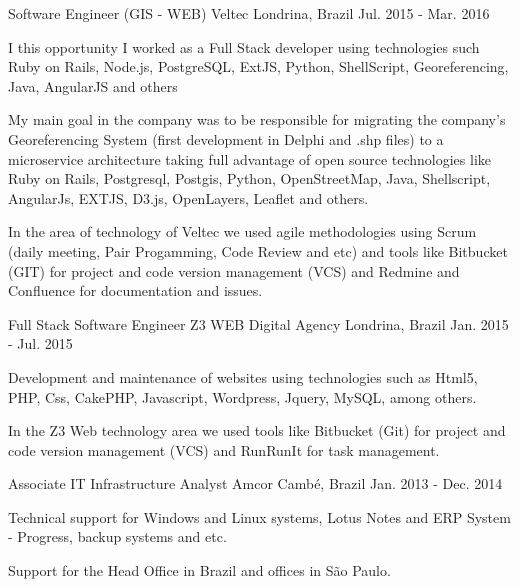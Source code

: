 \begin{cventries}
  \cventry
    {Software Engineer (GIS - WEB)} %
    {Veltec} %
    {Londrina, Brazil} %
    {Jul. 2015 - Mar. 2016} %
    {
      \begin{cvitems} %
        \item { I this opportunity I worked as a Full Stack developer using technologies such Ruby on Rails, Node.js, PostgreSQL, ExtJS, Python, ShellScript, Georeferencing, Java, AngularJS and others}
\item {My main goal in the company was to be responsible for migrating the company's Georeferencing System (first development in Delphi and .shp files) to a microservice architecture taking full advantage of open source technologies like Ruby on Rails, Postgresql, Postgis, Python, OpenStreetMap, Java, Shellscript, AngularJs, EXTJS, D3.js, OpenLayers, Leaflet and others.}
\item {In the area of technology of Veltec we used agile methodologies using Scrum (daily meeting, Pair Progamming, Code Review and etc) and tools like Bitbucket (GIT) for project and code version management (VCS) and Redmine and Confluence for documentation and issues.}
      \end{cvitems}
    }

  \cventry
    {Full Stack Software Engineer} %
    {Z3 WEB Digital Agency} %
    {Londrina, Brazil} %
    {Jan. 2015 - Jul. 2015} %
    {
      \begin{cvitems} %
        \item {Development and maintenance of websites using technologies such as Html5, PHP, Css, CakePHP, Javascript, Wordpress, Jquery, MySQL, among others.}
\item {In the Z3 Web technology area we used tools like Bitbucket (Git) for project and code version management (VCS) and RunRunIt for task management.}
      \end{cvitems}
    }

  \cventry
    {Associate IT Infrastructure Analyst} %
    {Amcor} %
    {Cambé, Brazil} %
    {Jan. 2013 - Dec. 2014} %
    {
      \begin{cvitems} %
        \item {Technical support for Windows and Linux systems, Lotus Notes and ERP System - Progress, backup systems and etc.}
        \item {Support for the Head Office in Brazil and offices in São Paulo.}
      \end{cvitems}
    }

\end{cventries}

